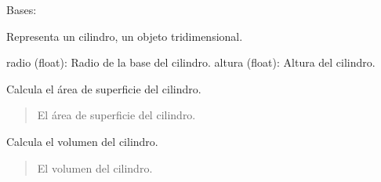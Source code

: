 \documentclass[letterpaper,10pt,spanish]{sphinxmanual}
\begin{document}
\begin{fulllineitems}
\label{\detokenize{pr8:pr8.3.Cilindro}}
\pysigstartsignatures
{}
\pysigstopsignatures
\sphinxAtStartPar
Bases: {\hyperref[\detokenize{pr8:pr8.3.Objeto3D}]{}}

\sphinxAtStartPar
Representa un cilindro, un objeto tridimensional.
\begin{description}
\sphinxAtStartPar
radio (float): Radio de la base del cilindro.
altura (float): Altura del cilindro.

\end{description}

\begin{fulllineitems}
\label{\detokenize{pr8:pr8.3.Cilindro.area_superficie}}
\pysigstartsignatures
{}
\pysigstopsignatures
\sphinxAtStartPar
Calcula el área de superficie del cilindro.
\begin{quote}\begin{description}
\sphinxAtStartPar
El área de superficie del cilindro.

\end{description}\end{quote}

\end{fulllineitems}


\begin{fulllineitems}
\label{\detokenize{pr8:pr8.3.Cilindro.volumen}}
\pysigstartsignatures
{}
\pysigstopsignatures
\sphinxAtStartPar
Calcula el volumen del cilindro.
\begin{quote}\begin{description}
\sphinxAtStartPar
El volumen del cilindro.

\end{description}\end{quote}

\end{fulllineitems}


\end{fulllineitems}
\end{document}
